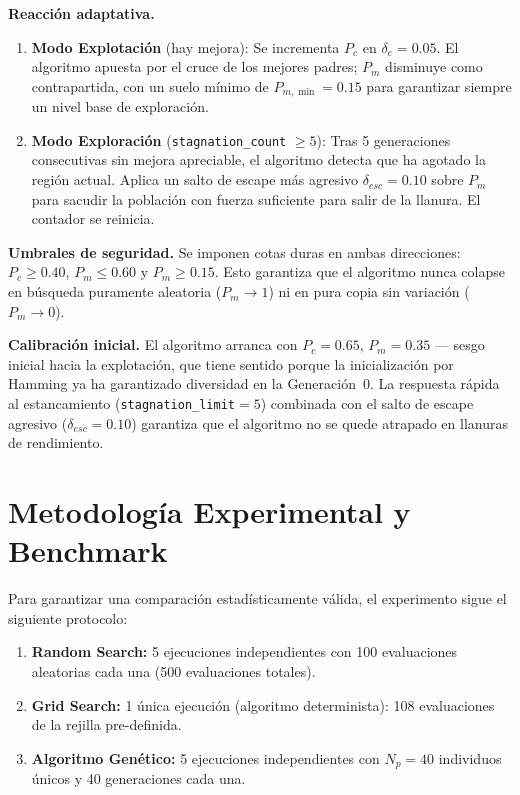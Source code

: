 \documentclass[12pt, a4paper]{article}
\begin{document}
\textbf{Reacción adaptativa.}
\begin{enumerate}[itemsep=0.3em]
  \item \textbf{Modo Explotación} (hay mejora): Se incrementa $P_c$ en $\delta_e = 0.05$.
        El algoritmo apuesta por el cruce de los mejores padres; $P_m$ disminuye como
        contrapartida, con un suelo mínimo de $P_{m,\min} = 0.15$ para garantizar
        siempre un nivel base de exploración.
  \item \textbf{Modo Exploración} (\texttt{stagnation\_count} $\geq 5$): Tras 5
        generaciones consecutivas sin mejora apreciable, el algoritmo detecta que ha
        agotado la región actual. Aplica un salto de escape más agresivo
        $\delta_{esc} = 0.10$ sobre $P_m$ para sacudir la población con fuerza
        suficiente para salir de la llanura. El contador se reinicia.
\end{enumerate}

\textbf{Umbrales de seguridad.} Se imponen cotas duras en ambas direcciones:
$P_c \geq 0.40$, $P_m \leq 0.60$ y $P_m \geq 0.15$. Esto garantiza que el
algoritmo nunca colapse en búsqueda puramente aleatoria ($P_m \to 1$)
ni en pura copia sin variación ($P_m \to 0$).

\textbf{Calibración inicial.} El algoritmo arranca con $P_c=0.65$, $P_m=0.35$
--- sesgo inicial hacia la explotación, que tiene sentido porque la inicialización
por Hamming ya ha garantizado diversidad en la Generación~0. La respuesta rápida
al estancamiento (\texttt{stagnation\_limit}$=5$) combinada con el salto de escape
agresivo ($\delta_{esc}=0.10$) garantiza que el algoritmo no se quede atrapado en
llanuras de rendimiento.

\section{Metodología Experimental y Benchmark}

Para garantizar una comparación estadísticamente válida, el experimento sigue el
siguiente protocolo:

\begin{enumerate}[itemsep=0.3em]
  \item \textbf{Random Search:} 5 ejecuciones independientes con 100 evaluaciones
        aleatorias cada una (500 evaluaciones totales).
  \item \textbf{Grid Search:} 1 única ejecución (algoritmo determinista): 108
        evaluaciones de la rejilla pre-definida.
  \item \textbf{Algoritmo Genético:} 5 ejecuciones independientes con $N_p = 40$
        individuos únicos y 40 generaciones cada una.
\end{enumerate}
\end{document}
